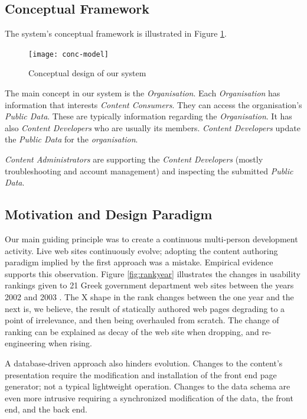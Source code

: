 \documentclass[10pt]{article}
\begin{document}
\subsection{Conceptual Framework}

The system's conceptual framework is illustrated in Figure \ref{fig:conc-model}.

\begin{figure}[h!]
\begin{center}
\texttt{[image: conc-model]}
\end{center}
\caption{Conceptual design of our system}
\label{fig:conc-model}
\end{figure}

The main concept in our system is the \textit{Organisation}. Each \textit{Organisation} has 
information that interests \textit{Content Consumers}. They 
can access the organisation's \textit{Public Data}.
These are typically information regarding the \textit{Organisation}.
It has also \textit{Content Developers} 
who are usually its members. \textit{Content Developers} update the 
\textit{Public Data} for the \textit{organisation}.

\textit{Content Administrators} are supporting the \textit{Content Developers} 
(mostly troubleshooting and account management)
and inspecting the submitted \textit{Public Data}.

\subsection{Motivation and Design Paradigm}

Our main guiding principle was to create a continuous multi-person 
development activity.
Live web sites continuously evolve;
adopting the content authoring paradigm implied
by the first approach was a mistake.
Empirical evidence supports this observation.
Figure \ref{fig:rankyear} illustrates the changes
in usability rankings given to 21 Greek government department
web sites between the years 2002 and 2003 \cite{G03}.
The X shape in the rank changes between the one year and the next
is, we believe, the result of statically authored web pages
degrading to a point of irrelevance, and then being overhauled
from scratch. The change of ranking can be explained as decay of the web site when dropping,
and re-engineering when rising.

A database-driven approach also hinders evolution.
Changes to the content's presentation require the modification
and installation of the front end page generator;
not a typical lightweight operation.
Changes to the data schema are even more intrusive
requiring a synchronized modification of the data,
the front end, and the back end.
\end{document}
